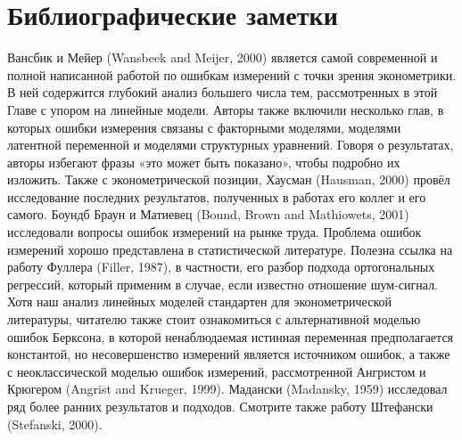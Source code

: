\section{Библиографические заметки} 
Вансбик и Мейер (Wansbeek and Meijer, 2000) является самой современной и полной написанной работой по ошибкам измерений с точки зрения эконометрики. В ней содержится глубокий анализ большего числа тем, рассмотренных в этой Главе с упором на линейные модели. Авторы также включили несколько глав, в которых ошибки измерения связаны с факторными моделями, моделями латентной переменной и моделями структурных уравнений. Говоря о результатах, авторы избегают фразы «это может быть показано», чтобы подробно их изложить. Также с эконометрической позиции, Хаусман (Hausman, 2000) провёл исследование последних результатов, полученных в работах его коллег и его самого. Боундб Браун и Матиевец (Bound, Brown and Mathiowets, 2001) исследовали вопросы ошибок измерений на рынке труда.
Проблема ошибок измерений хорошо представлена в статистической литературе. Полезна ссылка на работу Фуллера (Filler, 1987), в частности, его разбор подхода ортогональных регрессий, который применим в случае, если известно отношение шум-сигнал. Хотя наш анализ линейных моделей стандартен для эконометрической литературы, читателю также стоит ознакомиться с альтернативной моделью ошибок Берксона, в которой ненаблюдаемая истинная переменная предполагается константой, но несовершенство измерений является источником ошибок, а также с неоклассической моделью ошибок измерений, рассмотренной Ангристом и Крюгером (Angrist and Krueger, 1999). Мадански (Madansky, 1959) исследовал ряд более ранних результатов и подходов. Смотрите также работу Штефански (Stefanski, 2000).
